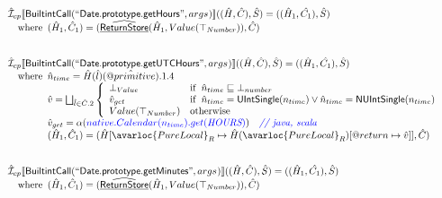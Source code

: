 \[
\begin{array}{l}


\aI _{cp}\lbr \SF{BuiltintCall}(``\SF{Date.prototype.getHours}",args_{})\rbr((\hat{H},\hat{C}), \hat{S})
  = ((\hat{H}_1, \hat{C_1}), \hat{S})\\
\quad\wherec{
  (\hat{H}_1, \hat{C}_1) = (\ahf{ReturnStore}(\hat{H}_1, Value(\top_{Number})), \hat{C})
  }\\
\\\\

\aI _{cp}\lbr \SF{BuiltintCall}(``\SF{Date.prototype.getUTCHours}",args_{})\rbr((\hat{H},\hat{C}), \hat{S})
  = ((\hat{H}_1, \hat{C_1}), \hat{S})\\
\quad\wherec{
  \hat{n}_{time} = \hat{H}(\hat{l})(\avarprop{primitive}).1.4\\
  \hat{v} = \bigsqcup_{\hat{l} \in \hat{C}.2} \left\{\begin{array}{ll}
      \bot_{Value} & \ifc{\hat{n}_{time} \sqsubseteq  \bot_{number}}\\
      \hat{v}_{get} &
      \ifc{\hat{n}_{time} = \SF{UIntSingle}(n_{time}) \lor\hat{n}_{time} = \SF{NUIntSingle}(n_{time}) }\\
      Value(\top_{Number}) & \owc
    \end{array}\right.\\
  \hat{v}_{get} = \alpha({\inblue native.Calendar(n_{time}).get(\emph{HOURS})})
    \quad\comment{{\inblue // java, scala}}\\  
  (\hat{H}_1, \hat{C}_1) = 
    (\hat{H}[\avarloc{PureLocal}_R \mapsto \hat{H}(\avarloc{PureLocal}_R)
      [\varprop{return} \mapsto \hat{v}]], \hat{C})\\
  }\\
\\\\

\aI _{cp}\lbr \SF{BuiltintCall}(``\SF{Date.prototype.getMinutes}",args_{})\rbr((\hat{H},\hat{C}), \hat{S})
  = ((\hat{H}_1, \hat{C_1}), \hat{S})\\
\quad\wherec{
  (\hat{H}_1, \hat{C}_1) = (\ahf{ReturnStore}(\hat{H}_1, Value(\top_{Number})), \hat{C})
  }\\
\\\\


\end{array}\]
